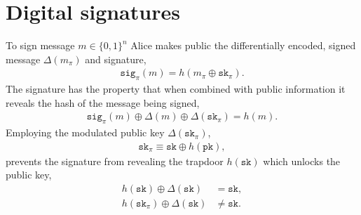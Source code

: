 \documentclass[twocolumn, aps, amsmath, amssymb, nofootinbib, superscriptaddress, longbibliography, doublefloatfix, table-of-contents, eqsecnum, rmp]{revtex4-2}
\begin{document}
%
%
%
%
%
%
%

\section{Digital signatures}

To sign message \mbox{$m\in\{0,1\}^n$} Alice makes public the differentially encoded, signed message $\Delta(m_\pi)$ and signature,
\begin{align}
	 \mathtt{sig}_\pi(m) = h(m_\pi \oplus \mathtt{sk}_\pi).
\end{align}
The signature has the property that when combined with public information it reveals the hash of the message being signed,
\begin{align}
	 \mathtt{sig}_\pi(m) \oplus \Delta(m) \oplus \Delta(\mathtt{sk}_\pi) = h(m).
\end{align}
Employing the modulated public key $\Delta(\mathtt{sk}_\pi)$,
\begin{align}
	\mathtt{sk}_\pi \equiv \mathtt{sk} \oplus h(\mathtt{pk}),
\end{align}
prevents the signature from revealing the trapdoor $h(\mathtt{sk})$ which unlocks the public key,
\begin{align}
	h(\mathtt{sk}) \oplus \Delta(\mathtt{sk}) &= \mathtt{sk},\nonumber\\
	h(\mathtt{sk}_\pi) \oplus \Delta(\mathtt{sk}) &\neq \mathtt{sk}.
\end{align}
\end{document}
